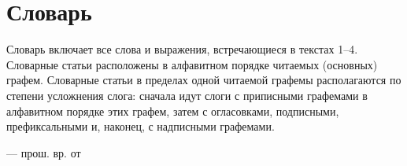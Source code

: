 \section{Словарь}

Словарь включает все слова и выражения, встречающиеся в текстах 1--4. Словарные статьи расположены в алфавитном порядке читаемых (основных) графем. Словарные статьи в пределах одной читаемой графемы располагаются по степени усложнения слога: сначала идут слоги с приписными графемами в алфавитном порядке этих графем, затем с огласовками, подписными, префиксальными и, наконец, с надписными графемами.

\begin{center}\end{center}
\begin{description}
	\item {}
	\item {}
	\item {}
	\item {}
\end{description}

\begin{center}\end{center}
\begin{description}
	\item {}
	\item {}
	\item {}
	\item {} --- прош. вр. от 
	\item {}
	\item {}
\end{description}

